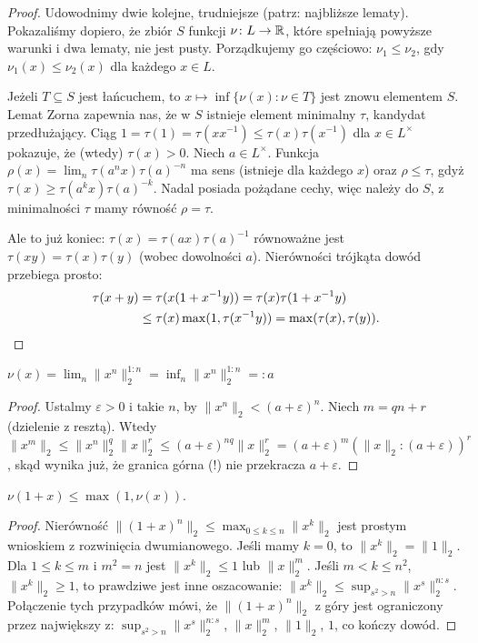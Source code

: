 \begin{proof}
	Udowodnimy dwie kolejne, trudniejsze (patrz: najbliższe lematy).
	Pokazaliśmy dopiero, że zbiór $S$ funkcji $\nu \colon L \to \mathbb R$, które spełniają powyższe warunki i dwa lematy, nie jest pusty.
	Porządkujemy go częściowo: $\nu_1 \le \nu_2$, gdy $\nu_1(x) \le \nu_2(x)$ dla każdego $x \in L$.
	
	Jeżeli $T \subseteq S$ jest łańcuchem, to $x \mapsto \inf \{\nu(x) : \nu \in T\}$ jest znowu elementem $S$.
	Lemat Zorna zapewnia nas, że w $S$ istnieje element minimalny $\tau$, kandydat przedłużający.
	Ciąg $1 = \tau(1) = \tau(xx^{-1}) \le \tau(x) \tau(x^{-1})$ dla $x \in L^\times$ pokazuje, że (wtedy) $\tau (x) > 0$.
	Niech $a \in L^\times$.
	Funkcja $\rho(x) = \lim_n \tau(a^nx)\tau(a)^{-n}$ ma sens (istnieje dla każdego $x$) oraz $\rho \le \tau$, gdyż $\tau(x) \ge \tau(a^kx)\tau(a)^{-k}$.
	Nadal posiada pożądane cechy, więc należy do $S$, z minimalności $\tau$ mamy równość $\rho = \tau$.
	
	Ale to już koniec: $\tau(x) = \tau(ax) \tau(a)^{-1}$ równoważne jest $\tau(xy) = \tau(x) \tau(y)$ (wobec dowolności $a$).
	Nierówności trójkąta dowód przebiega prosto:
	\begin{align*}
		\tau(x + y) & = \tau(x(1 + x^{-1}y)) = \tau(x) \tau(1 + x^{-1}y) \\
		& \le \tau(x) \max (1, \tau(x^{-1}y))  = \max(\tau(x), \tau(y)). \qedhere
	\end{align*}
\end{proof}

\begin{lemat}
	$\nu(x) = \lim_n \|x^n\|_2^{1:n} = \inf_n \|x^n\|_2^{1:n} =: a$
\end{lemat}

\begin{proof}
	Ustalmy $\varepsilon > 0$ i takie $n$, by $\|x^n\|_2 < (a + \varepsilon)^n$.
	Niech $m = qn + r$ (dzielenie z resztą).
	Wtedy $\|x^m\|_2 \le \|x^n\|_2^q \|x\|_2^r \le (a + \varepsilon)^{nq} \|x\|_2^r = (a + \varepsilon)^m (\|x\|_2 : (a + \varepsilon))^r$,
	skąd wynika już, że granica górna (!) nie przekracza $a + \varepsilon$.
\end{proof}

\begin{lemat}
	$\nu(1 + x) \le \max(1, \nu(x))$.
\end{lemat}

\begin{proof}
Nierówność $\|(1 + x)^n\|_2 \le \max_{0 \le k \le n} \|x^k\|_2$ jest prostym wnioskiem z rozwinięcia dwumianowego.
Jeśli mamy $k = 0$, to $\|x^k\|_2 = \|1\|_2$.
Dla $1 \le k \le m$ i $m^2 = n$ jest $\|x^k\|_2 \le 1$ lub  $\|x\|_2^m$.
Jeśli $m < k \le n^2$, $\|x^k\|_2 \ge 1$, to prawdziwe jest inne oszacowanie: $\|x^k\|_2 \le \sup_{s^2 > n} \|x^s\|_2^{n:s}$.
Połączenie tych przypadków mówi, że $\|(1+x)^n\|_2$ z góry jest ograniczony przez największy z: $\sup_{s^2 > n} \|x^s\|_2^{n:s}$, $\|x\|_2^m$, $\|1\|_2$, $1$, co kończy dowód.
\end{proof}

